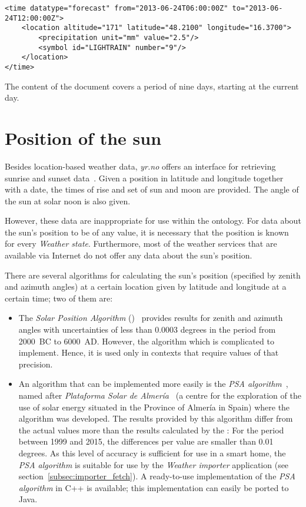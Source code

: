 \begin{lstlisting}
<time datatype="forecast" from="2013-06-24T06:00:00Z" to="2013-06-24T12:00:00Z">
	<location altitude="171" latitude="48.2100" longitude="16.3700">
		<precipitation unit="mm" value="2.5"/>
		<symbol id="LIGHTRAIN" number="9"/>
	</location>
</time>
\end{lstlisting}

The content of the  document covers a period of nine days, starting at the current day.

\section{Position of the sun}
\label{sec:sun_position}

Besides location-based weather data, \emph{yr.no} offers an interface for retrieving sunrise and sunset data~\cite{yrno_sunrise}. Given a position in latitude and longitude together with a date, the times of rise and set of sun and moon are provided. The angle of the sun at solar noon is also given.

However, these data are inappropriate for use within the \smarthomeweather ontology. For data about the sun's position to be of any value, it is necessary that the position is known for every \emph{Weather state}. Furthermore, most of the weather services that are available via Internet do not offer any data about the sun's position.

There are several algorithms for calculating the sun's position (specified by zenith and azimuth angles) at a certain location given by latitude and longitude at a certain time; two of them are:

\begin{itemize}
  \item The \emph{Solar Position Algorithm} ()~\cite{SPA_algorithm} provides results for zenith and azimuth angles with uncertainties of less than \num{0.0003} degrees in the period from 2000~BC to 6000~AD. However, the algorithm which is complicated to implement. Hence, it is used only in contexts that require values of that precision.
  
  \item An algorithm that can be implemented more easily is the \emph{\acs{PSA} algorithm}~\cite{PSA_algorithm}, named after \emph{Plataforma Solar de Almería}~\cite{PSA} (a centre for the exploration of the use of solar energy situated in the Province of Almería in Spain) where the algorithm was developed. The results provided by this algorithm differ from the actual values more than the results calculated by the : For the period between 1999 and 2015, the differences per value are smaller than \num{0.01} degrees. As this level of accuracy is sufficient for use in a smart home, the \emph{\acs{PSA} algorithm} is suitable for use by the \emph{Weather importer} application (see section~\ref{subsec:importer_fetch}). A ready-to-use implementation of the \emph{\acs{PSA} algorithm} in C++ is available; this implementation can easily be ported to Java.
\end{itemize}
